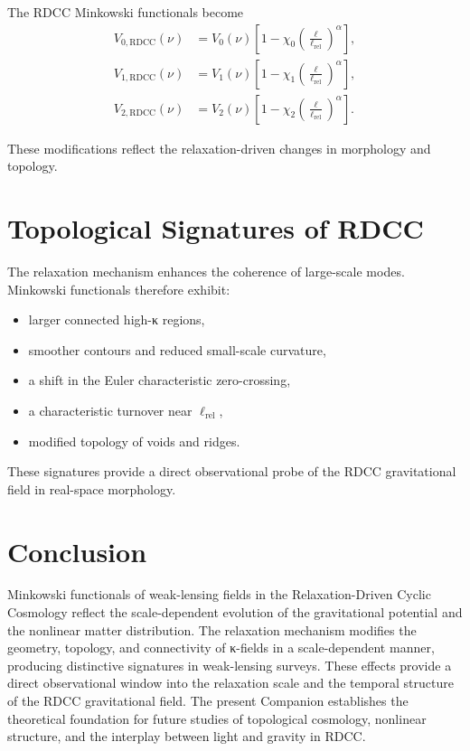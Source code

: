 \documentclass[11pt,a4paper]{article}
\begin{document}
The RDCC Minkowski functionals become
\begin{align}
    V_{0,\mathrm{RDCC}}(\nu)
    &= V_{0}(\nu)
       \left[
         1 - \chi_{0}
         \left(\frac{\ell}{\ell_{\mathrm{rel}}}\right)^{\alpha}
       \right], \\
    V_{1,\mathrm{RDCC}}(\nu)
    &= V_{1}(\nu)
       \left[
         1 - \chi_{1}
         \left(\frac{\ell}{\ell_{\mathrm{rel}}}\right)^{\alpha}
       \right], \\
    V_{2,\mathrm{RDCC}}(\nu)
    &= V_{2}(\nu)
       \left[
         1 - \chi_{2}
         \left(\frac{\ell}{\ell_{\mathrm{rel}}}\right)^{\alpha}
       \right].
\end{align}

These modifications reflect the relaxation-driven changes in morphology and 
topology.
\section{Topological Signatures of RDCC}

The relaxation mechanism enhances the coherence of large-scale modes. Minkowski 
functionals therefore exhibit:

\begin{itemize}
    \item larger connected high-κ regions,
    \item smoother contours and reduced small-scale curvature,
    \item a shift in the Euler characteristic zero-crossing,
    \item a characteristic turnover near $\ell_{\mathrm{rel}}$,
    \item modified topology of voids and ridges.
\end{itemize}

These signatures provide a direct observational probe of the RDCC gravitational 
field in real-space morphology.
\section{Conclusion}

Minkowski functionals of weak-lensing fields in the Relaxation-Driven Cyclic 
Cosmology reflect the scale-dependent evolution of the gravitational potential and 
the nonlinear matter distribution. The relaxation mechanism modifies the geometry, 
topology, and connectivity of κ-fields in a scale-dependent manner, producing 
distinctive signatures in weak-lensing surveys. These effects provide a direct 
observational window into the relaxation scale and the temporal structure of the 
RDCC gravitational field. The present Companion establishes the theoretical 
foundation for future studies of topological cosmology, nonlinear structure, and 
the interplay between light and gravity in RDCC.


\nocite{*}

\end{document}
